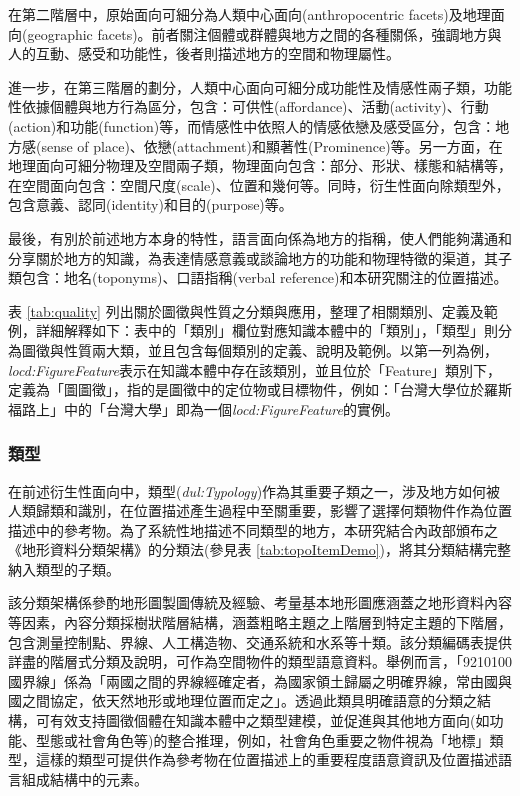在第二階層中，原始面向可細分為人類中心面向(anthropocentric facets)及地理面向(geographic facets)。前者關注個體或群體與地方之間的各種關係，強調地方與人的互動、感受和功能性，後者則描述地方的空間和物理屬性。

進一步，在第三階層的劃分，人類中心面向可細分成功能性及情感性兩子類，功能性依據個體與地方行為區分，包含：可供性(affordance)、活動(activity)、行動(action)和功能(function)等，而情感性中依照人的情感依戀及感受區分，包含：地方感(sense of place)、依戀(attachment)和顯著性(Prominence)等。另一方面，在地理面向可細分物理及空間兩子類，物理面向包含：部分、形狀、樣態和結構等，在空間面向包含：空間尺度(scale)、位置和幾何等。同時，衍生性面向除類型外，包含意義、認同(identity)和目的(purpose)等。

最後，有別於前述地方本身的特性，語言面向係為地方的指稱，使人們能夠溝通和分享關於地方的知識，為表達情感意義或談論地方的功能和物理特徵的渠道，其子類包含：地名(toponyms)、口語指稱(verbal reference)和本研究關注的位置描述。

表 \ref{tab:quality} 列出關於圖徵與性質之分類與應用，整理了相關類別、定義及範例，詳細解釋如下：表中的「類別」欄位對應知識本體中的「類別」，「類型」則分為圖徵與性質兩大類，並且包含每個類別的定義、說明及範例。以第一列為例，\textit{locd:FigureFeature}表示在知識本體中存在該類別，並且位於「Feature」類別下，定義為「圖圖徵」，指的是圖徵中的定位物或目標物件，例如：「台灣大學位於羅斯福路上」中的「台灣大學」即為一個\textit{locd:FigureFeature}的實例。



\subsubsection{類型}

在前述衍生性面向中，類型(\textit{dul:Typology})作為其重要子類之一，涉及地方如何被人類歸類和識別，在位置描述產生過程中至關重要，影響了選擇何類物件作為位置描述中的參考物。為了系統性地描述不同類型的地方，本研究結合內政部頒布之《地形資料分類架構》的分類法(參見表 \ref{tab:topoItemDemo})，將其分類結構完整納入類型的子類。

該分類架構係參酌地形圖製圖傳統及經驗、考量基本地形圖應涵蓋之地形資料內容等因素，內容分類採樹狀階層結構，涵蓋粗略主題之上階層到特定主題的下階層，包含測量控制點、界線、人工構造物、交通系統和水系等十類。該分類編碼表提供詳盡的階層式分類及說明，可作為空間物件的類型語意資料。舉例而言，「9210100國界線」係為「兩國之間的界線經確定者，為國家領土歸屬之明確界線，常由國與國之間協定，依天然地形或地理位置而定之」。透過此類具明確語意的分類之結構，可有效支持圖徵個體在知識本體中之類型建模，並促進與其他地方面向(如功能、型態或社會角色等)的整合推理，例如，社會角色重要之物件視為「地標」類型，這樣的類型可提供作為參考物在位置描述上的重要程度語意資訊及位置描述語言組成結構中的元素。

